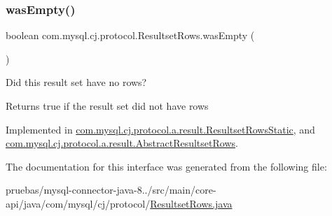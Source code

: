 \mbox{\label{interfacecom_1_1mysql_1_1cj_1_1protocol_1_1_resultset_rows_a46258b5b85f7536a54d62054403e6cf8}} 
\subsubsection{\texorpdfstring{was\+Empty()}{wasEmpty()}}
{\footnotesize\ttfamily boolean com.\+mysql.\+cj.\+protocol.\+Resultset\+Rows.\+was\+Empty (\begin{DoxyParamCaption}{ }\end{DoxyParamCaption})}

Did this result set have no rows?

\begin{DoxyReturn}{Returns}
true if the result set did not have rows 
\end{DoxyReturn}


Implemented in \mbox{\hyperlink{classcom_1_1mysql_1_1cj_1_1protocol_1_1a_1_1result_1_1_resultset_rows_static_ad18792e2f43667c3dc0b6e41a6de3026}{com.\+mysql.\+cj.\+protocol.\+a.\+result.\+Resultset\+Rows\+Static}}, and \mbox{\hyperlink{classcom_1_1mysql_1_1cj_1_1protocol_1_1a_1_1result_1_1_abstract_resultset_rows_ae97f8b33948868aab21df7320f9f91f4}{com.\+mysql.\+cj.\+protocol.\+a.\+result.\+Abstract\+Resultset\+Rows}}.



The documentation for this interface was generated from the following file\+:\begin{DoxyCompactItemize}
\item 
pruebas/mysql-\/connector-\/java-\/8../src/main/core-\/api/java/com/mysql/cj/protocol/\mbox{\hyperlink{_resultset_rows_8java}{Resultset\+Rows.\+java}}\end{DoxyCompactItemize}
